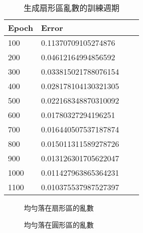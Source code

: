 \documentclass[12pt, a4paper]{article}
\begin{document}
\begin{table}[h]
\begin{center}
\caption{生成扇形區亂數的訓練週期}\label{tb:生成扇形區亂數的訓練週期}
\extrarowheight=4pt
\begin{tabular}{llll}
\rowcolor[gray]{.9}
Epoch	   &	 	Error\\
\toprule
100&0.11370709105274876\\
200&0.04612164994856592\\
300&0.033815021788076154\\
400&0.028178104130321305\\
500&0.022168348870310092\\
600&0.01780327294196251\\
700&0.016440507537187874\\
800&0.015011311589278726\\
900&0.013126301705622047\\
1000&0.011427963865364231\\
1100&0.010375537987527397\\
\bottomrule
\end{tabular}
\end{center}
\end{table}


\begin{figure}[H]
    \caption{均勻落在扇形區的亂數}
    \label{fig:均勻落在扇形區的亂數}
\end{figure}
\begin{figure}[H]
    \caption{均勻落在圓形區的亂數}
    \label{fig:均勻落在圓形區的亂數}
\end{figure}
\end{document}
